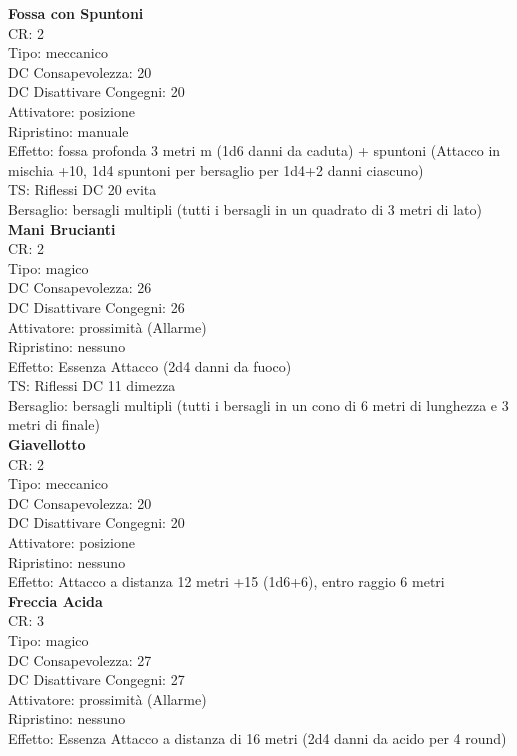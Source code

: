 \documentclass[a4paper,11pt,twoside,openany]{book}
\begin{document}
\begin{multicols}{2}
	\textbf{Fossa con Spuntoni}\\
	CR: 2 \\
	Tipo: meccanico \\
	DC Consapevolezza: 20 \\
	DC Disattivare Congegni: 20 \\
	Attivatore: posizione \\
	Ripristino: manuale \\
	Effetto: fossa profonda 3 metri m (1d6 danni da caduta) + spuntoni (Attacco in mischia +10, 1d4 spuntoni per bersaglio per 1d4+2 danni ciascuno) \\
	TS: Riflessi DC 20 evita \\
	Bersaglio: bersagli multipli (tutti i bersagli in un quadrato di 3 metri di lato)\\

	\textbf{Mani Brucianti}\\
	CR: 2 \\
	Tipo: magico \\
	DC Consapevolezza: 26 \\
	DC Disattivare Congegni: 26 \\
	Attivatore: prossimità (Allarme) \\
	Ripristino: nessuno \\
	Effetto: Essenza Attacco (2d4 danni da fuoco) \\
	TS: Riflessi DC 11 dimezza \\
	Bersaglio: bersagli multipli (tutti i bersagli in un cono di 6 metri di lunghezza e 3 metri di finale)\\

	\textbf{Giavellotto}\\
	CR: 2 \\
	Tipo: meccanico \\
	DC Consapevolezza: 20 \\
	DC Disattivare Congegni: 20 \\
	Attivatore: posizione \\
	Ripristino: nessuno \\
	Effetto: Attacco a distanza 12 metri +15 (1d6+6), entro raggio 6 metri\\

	\textbf{Freccia Acida}\\
	CR: 3 \\
	Tipo: magico \\
	DC Consapevolezza: 27 \\
	DC Disattivare Congegni: 27 \\
	Attivatore: prossimità (Allarme) \\
	Ripristino: nessuno \\
	Effetto: Essenza Attacco a distanza di 16 metri (2d4 danni da acido per 4 round)\\


\end{multicols}
\end{document}
